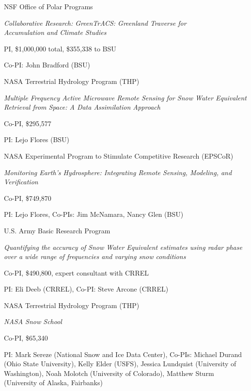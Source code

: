 \documentclass[11pt]{article}
\renewenvironment{itemize}{
  \begin{list}{}{
    \setlength{\leftmargin}{1.5em}
    \setlength{\itemsep}{0pt}
    \setlength{\parskip}{0pt}
  }
}{
  \end{list}
}
\begin{document}
\begin{itemize}
\item [1/2015-12/2017] NSF Office of Polar Programs
\begin{itemize}
\item \textit{Collaborative Research: GreenTrACS: Greenland Traverse for \\ Accumulation and Climate Studies}
\item PI, \$1,000,000 total, \$355,338 to BSU
\item Co-PI: John Bradford (BSU)
\end{itemize}

\pagebreak

\item[7/2015-6/2018] NASA Terrestrial Hydrology Program (THP)
\begin{itemize}
\item \textit{Multiple Frequency Active Microwave Remote Sensing for Snow Water Equivalent Retrieval from Space: A Data Assimilation Approach}
\item Co-PI, \$295,577
\item PI: Lejo Flores (BSU)
\end{itemize}

\item[6/2014-6/2018] NASA Experimental Program to Stimulate Competitive Research (EPSCoR)
\begin{itemize}
\item \textit{Monitoring Earth's Hydrosphere: Integrating Remote Sensing, Modeling, and Verification}
\item Co-PI, \$749,870
\item PI: Lejo Flores, Co-PIs: Jim McNamara, Nancy Glen (BSU)
\end{itemize}

\item[10/2013-9/2016] U.S. Army Basic Research Program
\begin{itemize}
\item \textit{Quantifying the accuracy of Snow Water Equivalent estimates using radar phase over a wide range of frequencies and varying snow conditions}
\item Co-PI, \$490,800, expert consultant with CRREL
\item PI: Eli Deeb (CRREL), Co-PI: Steve Arcone (CRREL)
\end{itemize}

\item[1/2014-12/2014] NASA Terrestrial Hydrology Program (THP)
\begin{itemize}
\item \textit{NASA Snow School}
\item Co-PI, \$65,340
\item PI: Mark Sereze (National Snow and Ice Data Center), Co-PIs: Michael Durand (Ohio State University), Kelly Elder (USFS),
Jessica Lundquist (University of Washington), Noah Molotch (University of Colorado), Matthew Sturm (University of Alaska, Fairbanks)
\end{itemize}


\end{itemize}
\end{document}
